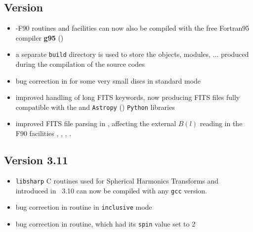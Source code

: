 \documentclass[12pt,twoside]{article}
\begin{document}
\subsection{Version \hpxversion}
\begin{itemize}
	\item \healpixns-F90 routines and facilities can now also be compiled with
the free Fortran95 compiler \textbf{g95} ()
	\item a separate {\tt build} directory is used to store the objects,
modules, ... produced during the compilation of the source codes
	\item bug correction in  for
some very small discs in standard mode
	\item improved handling of long FITS keywords, now producing FITS files
fully compatible with the
and 
{\tt Astropy} ()
{\tt Python} libraries
	\item improved FITS file parsing in 
,
affecting the external $B(l)$ reading in the F90 facilities 
, 
, 
, 
.
\end{itemize}

\subsection{Version 3.11}
\label{sub:new3p11}
\begin{itemize}
	\item {\tt libsharp} C routines used for Spherical Harmonics Transforms 
	and introduced in \healpix\ 3.10
	can now be compiled with any {\tt gcc} version.
	\item bug correction in 
	routine in {\tt inclusive} mode
	\item bug correction in  
	routine, which had its {\tt spin} value set to 2
\end{itemize}
\end{document}
